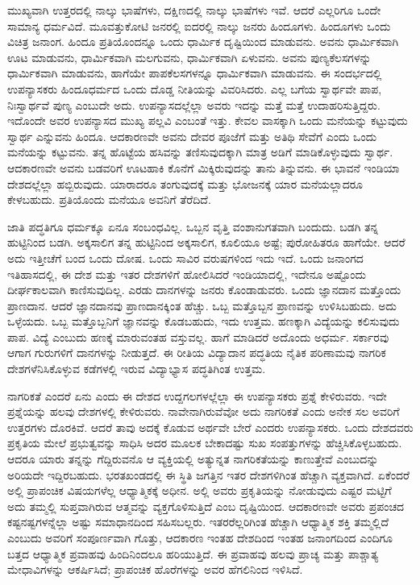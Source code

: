 ಮುಖ್ಯವಾಗಿ ಉತ್ತರದಲ್ಲಿ ನಾಲ್ಕು ಭಾಷೆಗಳು, ದಕ್ಷಿಣದಲ್ಲಿ ನಾಲ್ಕು ಭಾಷೆಗಳು ಇವೆ. ಆದರೆ ಎಲ್ಲರಿಗೂ ಒಂದೇ ಸಾಮಾನ್ಯ ಧರ್ಮವಿದೆ. ಮೂವತ್ತುಕೋಟಿ ಜನರಲ್ಲಿ ಐದರಲ್ಲಿ ನಾಲ್ಕು ಜನರು ಹಿಂದೂಗಳು. ಹಿಂದೂಗಳು ಒಂದು ವಿಚಿತ್ರ ಜನಾಂಗ. ಹಿಂದೂ ಪ್ರತಿಯೊಂದನ್ನೂ ಒಂದು ಧಾರ್ಮಿಕ ದೃಷ್ಟಿಯಿಂದ ಮಾಡುವನು. ಅವನು ಧಾರ್ಮಿಕವಾಗಿ ಊಟ ಮಾಡುವನು, ಧಾರ್ಮಿಕವಾಗಿ ಮಲಗುವನು, ಧಾರ್ಮಿಕವಾಗಿ ಏಳುವನು. ಅವನು ಪುಣ್ಯಕೆಲಸಗಳನ್ನು ಧಾರ್ಮಿಕವಾಗಿ ಮಾಡುವನು, ಹಾಗೆಯೇ ಪಾಪಕೆಲಸಗಳನ್ನೂ ಧಾರ್ಮಿಕವಾಗಿ ಮಾಡುವನು. ಈ ಸಂದರ್ಭದಲ್ಲಿ ಉಪನ್ಯಾಸಕರು ಹಿಂದೂಧರ್ಮದ ಒಂದು ದೊಡ್ಡ ನೀತಿಯನ್ನು ವಿವರಿಸಿದರು. ಎಲ್ಲ ಬಗೆಯ ಸ್ವಾರ್ಥವೇ ಪಾಪ, ನಿಃಸ್ವಾರ್ಥವೆ ಪುಣ್ಯ ಎಂಬುದೇ ಅದು. ಉಪನ್ಯಾಸದಲ್ಲೆಲ್ಲಾ ಅವರು ಇದನ್ನು ಮತ್ತೆ ಮತ್ತೆ ಉದಾಹರಿಸುತ್ತಿದ್ದರು. ಇದೊಂದೇ ಅವರ ಉಪನ್ಯಾಸದ ಮುಖ್ಯ ಪಲ್ಲವಿ ಎಂಬಂತೆ ಇತ್ತು. ಕೇವಲ ವಾಸಕ್ಕಾಗಿ ಒಂದು ಮನೆಯನ್ನು ಕಟ್ಟುವುದು ಸ್ವಾರ್ಥ ಎನ್ನುವನು ಹಿಂದೂ. ಆದಕಾರಣವೇ ಅವನು ದೇವರ ಪೂಜೆಗೆ ಮತ್ತು ಅತಿಥಿ ಸೇವೆಗೆ ಎಂದು ಒಂದು ಮನೆಯನ್ನು ಕಟ್ಟುವನು. ತನ್ನ ಹೊಟ್ಟೆಯ ಹಸಿವನ್ನು ತಣಿಸುವುದಕ್ಕಾಗಿ ಮಾತ್ರ ಅಡಿಗೆ ಮಾಡಿಕೊಳ್ಳುವುದು ಸ್ವಾರ್ಥ. ಆದಕಾರಣವೇ ಅವನು ಬಡವರಿಗೆ ಊಟಹಾಕಿ ಕೊನೆಗೆ ಮಿಕ್ಕಿರುವುದನ್ನು ತಾನು ತಿನ್ನುವನು. ಈ ಭಾವನೆ ಇಂಡಿಯಾ ದೇಶದಲ್ಲೆಲ್ಲಾ ಹಬ್ಬಿರುವುದು. ಯಾರಾದರೂ ತಂಗುವುದಕ್ಕೆ ಮತ್ತು ಭೋಜನಕ್ಕೆ ಯಾರ ಮನೆಯಲ್ಲಾದರೂ ಕೇಳಬಹುದು. ಪ್ರತಿಯೊಂದು ಮನೆಯೂ ಅವನಿಗೆ ತೆರೆದಿದೆ.

ಜಾತಿ ಪದ್ಧತಿಗೂ ಧರ್ಮಕ್ಕೂ ಏನೂ ಸಂಬಂಧವಿಲ್ಲ. ಒಬ್ಬನ ವೃತ್ತಿ ವಂಶಾನುಗತವಾಗಿ ಬಂದುದು. ಬಡಗಿ ತನ್ನ ಹುಟ್ಟಿನಿಂದ ಬಡಗಿ. ಅಕ್ಕಸಾಲಿಗ ತನ್ನ ಹುಟ್ಟಿನಿಂದ ಅಕ್ಕಸಾಲಿಗ, ಕೂಲಿಯೂ ಅಷ್ಟೆ; ಪುರೋಹಿತರೂ ಹಾಗೆಯೇ. ಆದರೆ ಅದು ಇತ್ತೀಚೆಗೆ ಬಂದ ಒಂದು ದೋಷ. ಒಂದು ಸಾವಿರ ವರುಷಗಳಿಂದ ಇದು ಇದೆ. ಒಂದು ಜನಾಂಗದ ಇತಿಹಾಸದಲ್ಲಿ, ಈ ದೇಶ ಮತ್ತು ಇತರ ದೇಶಗಳಿಗೆ ಹೋಲಿಸಿದರೆ ಇಂಡಿಯಾದಲ್ಲಿ, ಇದೇನೂ ಅಷ್ಟೊಂದು ದೀರ್ಘಕಾಲವಾಗಿ ಕಾಣಿಸುವುದಿಲ್ಲ. ಎರಡು ದಾನಗಳನ್ನು ಜನರು ಕೊಂಡಾಡುವರು. ಒಂದು ಜ್ಞಾನದಾನ ಮತ್ತೊಂದು ಪ್ರಾಣದಾನ. ಆದರೆ ಜ್ಞಾನದಾನವು ಪ್ರಾಣದಾನಕ್ಕಿಂತ ಹೆಚ್ಚು. ಒಬ್ಬ ಮತ್ತೊಬ್ಬನ ಪ್ರಾಣವನ್ನು ಉಳಿಸಿಬಹುದು. ಅದು ಒಳ್ಳೆಯದು. ಒಬ್ಬ ಮತ್ತೊಬ್ಬನಿಗೆ ಜ್ಞಾನವನ್ನು ಕೊಡಬಹುದು, ಇದು ಉತ್ತಮ. ಹಣಕ್ಕಾಗಿ ವಿದ್ಯೆಯನ್ನು ಕಲಿಸುವುದು ಪಾಪ. ವಿದ್ಯೆ ಎಂಬುದು ಹಣಕ್ಕೆ ಮಾರುವಂತಹ ವಸ್ತುವಲ್ಲ. ಹಾಗೆ ಮಾಡಿದರೆ ಅದೊಂದು ಅಧರ್ಮ. ಸರ್ಕಾರವು ಆಗಾಗ ಗುರುಗಳಿಗೆ ದಾನಗಳನ್ನು ನೀಡುತ್ತದೆ. ಈ ರೀತಿಯ ವಿದ್ಯಾದಾನ ಪದ್ಧತಿಯ ನೈತಿಕ ಪರಿಣಾಮವು ನಾಗರಿಕ ದೇಶಗಳೆನಿಸಿಕೊಳ್ಳುವ ಕಡೆಗಳಲ್ಲಿ ಇರುವ ವಿದ್ಯಾಭ್ಯಾಸ ಪದ್ಧತಿಗಿಂತ ಉತ್ತಮ.

ನಾಗರಿಕತೆ ಎಂದರೆ ಏನು ಎಂದು ಈ ದೇಶದ ಉದ್ದಗಲಗಳಲ್ಲೆಲ್ಲಾ ಈ ಉಪನ್ಯಾಸಕರು ಪ್ರಶ್ನೆ ಕೇಳಿರುವರು. ಇದೇ ಪ್ರಶ್ನೆಯನ್ನು ಹಲವು ದೇಶಗಳಲ್ಲಿ ಕೇಳಿರುವರು. ನಾವೇನಾಗಿರುವೆವೋ ಅದು ನಾಗರಿಕತೆ ಎಂದು ಅನೇಕ ಸಲ ಅವರಿಗೆ ಉತ್ತರಗಳು ದೊರಕಿವೆ. ಆದರೆ ತಾವು ಅದಕ್ಕೆ ಕೊಡುವ ಅರ್ಥವೇ ಬೇರೆ ಎಂದರು ಉಪನ್ಯಾಸಕರು. ಒಂದು ದೇಶದವರು ಪ್ರಕೃತಿಯ ಮೇಲೆ ಪ್ರಭುತ್ವವನ್ನು ಸಾಧಿಸಿ ಅದರ ಮೂಲಕ ಬೇಕಾದಷ್ಟು ಸುಖ ಸಂಪತ್ತುಗಳನ್ನು ಹೆಚ್ಚಿಸಿಕೊಳ್ಳಬಹುದು. ಆದರೂ ಯಾರು ತನ್ನನ್ನು ಗೆದ್ದಿರುವನೊ ಆ ವ್ಯಕ್ತಿಯಲ್ಲಿ ಅತ್ಯುನ್ನತ ನಾಗರಿಕತೆಯನ್ನು ಕಾಣುತ್ತೇವೆ ಎಂಬುದನ್ನು ಅರಿಯದೇ ಇದ್ದಿರಬಹುದು. ಭರತಖಂಡದಲ್ಲಿ ಈ ಸ್ಥಿತಿ ಜಗತ್ತಿನ ಇತರ ದೇಶಗಳಿಗಿಂತ ಹೆಚ್ಚಾಗಿ ವ್ಯಕ್ತವಾಗಿದೆ. ಏಕೆಂದರೆ ಅಲ್ಲಿ ಪ್ರಾಪಂಚಿಕ ವಿಷಯಗಳೆಲ್ಲ ಆಧ್ಯಾತ್ಮಿಕಕ್ಕೆ ಅಧೀನ. ಅಲ್ಲಿ ಅವರು ಪ್ರಕೃತಿಯನ್ನು ನೋಡುವುದು ಎಷ್ಟರ ಮಟ್ಟಿಗೆ ಅದು ತಮ್ಮಲ್ಲಿ ಸುಪ್ತವಾಗಿರುವ ಆತ್ಮವನ್ನು ವ್ಯಕ್ತಗೊಳಿಸುತ್ತಿದೆ ಎಂಬ ದೃಷ್ಟಿಯಿಂದ. ಆದಕಾರಣವೇ ಅವರು ಪ್ರಪಂಚದ ಕಷ್ಟನಷ್ಟಗಳನ್ನೆಲ್ಲಾ ಅಷ್ಟು ಸಮಾಧಾನದಿಂದ ಸಹಿಸಬಲ್ಲರು. ಇತರರೆಲ್ಲರಿಗಿಂತ ಹೆಚ್ಚಾಗಿ ಆಧ್ಯಾತ್ಮಿಕ ಶಕ್ತಿ ತಮ್ಮಲ್ಲಿದೆ ಎಂಬುದು ಅವರಿಗೆ ಸಂಪೂರ್ಣವಾಗಿ ಗೊತ್ತು, ಆದಕಾರಣ ಇಂತಹ ದೇಶದಿಂದ ಇಂತಹ ಜನಾಂಗದಿಂದ ಎಂದಿಗೂ ಬತ್ತದ ಆಧ್ಯಾತ್ಮಿಕ ಪ್ರವಾಹವು ಹಿಂದಿನಿಂದಲೂ ಹರಿಯುತ್ತಿದೆ. ಈ ಪ್ರವಾಹವು ಹಲವು ಪ್ರಾಚ್ಯ ಮತ್ತು ಪಾಶ್ಚಾತ್ಯ ಮೇಧಾವಿಗಳನ್ನು ಆಕರ್ಷಿಸಿದೆ; ಪ್ರಾಪಂಚಿಕ ಹೊರೆಗಳನ್ನು ಅವರ ಹೆಗಲಿನಿಂದ ಇಳಿಸಿದೆ.

